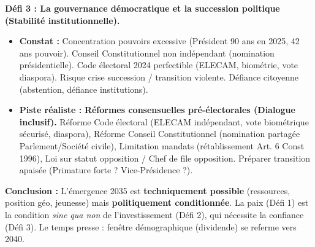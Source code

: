 \documentclass[11pt]{article}
\begin{document}
\begin{exoresolu}
\begin{itemize}
\end{itemize}
\textbf{Défi 3 : La gouvernance démocratique et la succession politique (Stabilité institutionnelle).}
\begin{itemize}
    \item \textbf{Constat :} Concentration pouvoirs excessive (Président 90 ans en 2025, 42 ans pouvoir). Conseil Constitutionnel non indépendant (nomination présidentielle). Code électoral 2024 perfectible (ELECAM, biométrie, vote diaspora). Risque crise succession / transition violente. Défiance citoyenne (abstention, défiance institutions).
    \item \textbf{Piste réaliste :} \textbf{Réformes consensuelles pré-électorales (Dialogue inclusif).} Réforme Code électoral (ELECAM indépendant, vote biométrique sécurisé, diaspora), Réforme Conseil Constitutionnel (nomination partagée Parlement/Société civile), Limitation mandats (rétablissement Art. 6 Const 1996), Loi sur statut opposition / Chef de file opposition. Préparer transition apaisée (Primature forte ? Vice-Présidence ?).
\end{itemize}
\textbf{Conclusion :} L'émergence 2035 est \textbf{techniquement possible} (ressources, position géo, jeunesse) mais \textbf{politiquement conditionnée}. La paix (Défi 1) est la condition \textit{sine qua non} de l'investissement (Défi 2), qui nécessite la confiance (Défi 3). Le temps presse : fenêtre démographique (dividende) se referme vers 2040.
\end{exoresolu}
\end{document}
